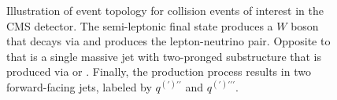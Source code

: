 \begin{figure}[htbp]
  \centering
  
  \caption{
    Illustration of event topology for \VBF collision events of interest in the CMS detector.
    The semi-leptonic final state produces a $W$ boson that decays via \Wtolnu and produces the lepton-neutrino pair.
    Opposite to that is a single massive jet with two-pronged substructure that is produced via \Vtoqqbarpr or \Htobbbar.
    Finally, the \VBF production process results in two forward-facing jets, labeled by $q^{(\prime)\prime\prime}$ and $q^{(\prime)\prime\prime\prime}$.
  }
  \label{fig:eventTop}
\end{figure}

